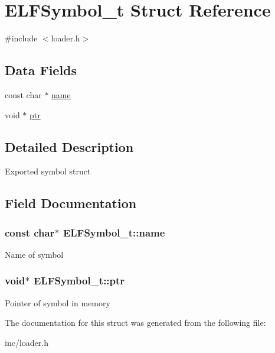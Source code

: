 \hypertarget{structELFSymbol__t}{}\section{E\+L\+F\+Symbol\+\_\+t Struct Reference}
\label{structELFSymbol__t}


{\ttfamily \#include $<$loader.\+h$>$}

\subsection*{Data Fields}
\begin{DoxyCompactItemize}
\item 
const char $\ast$ \hyperlink{structELFSymbol__t_ab6d4a23a497d4511b045d1208984eae4}{name}
\item 
void $\ast$ \hyperlink{structELFSymbol__t_ace2b2fb2504778129a888fb36ff58071}{ptr}
\end{DoxyCompactItemize}


\subsection{Detailed Description}
Exported symbol struct 

\subsection{Field Documentation}
\subsubsection[{\texorpdfstring{name}{name}}]{\setlength{\rightskip}{0pt plus 5cm}const char$\ast$ E\+L\+F\+Symbol\+\_\+t\+::name}\hypertarget{structELFSymbol__t_ab6d4a23a497d4511b045d1208984eae4}{}\label{structELFSymbol__t_ab6d4a23a497d4511b045d1208984eae4}
Name of symbol 
\subsubsection[{\texorpdfstring{ptr}{ptr}}]{\setlength{\rightskip}{0pt plus 5cm}void$\ast$ E\+L\+F\+Symbol\+\_\+t\+::ptr}\hypertarget{structELFSymbol__t_ace2b2fb2504778129a888fb36ff58071}{}\label{structELFSymbol__t_ace2b2fb2504778129a888fb36ff58071}
Pointer of symbol in memory 

The documentation for this struct was generated from the following file\+:\begin{DoxyCompactItemize}
\item 
inc/loader.\+h\end{DoxyCompactItemize}
